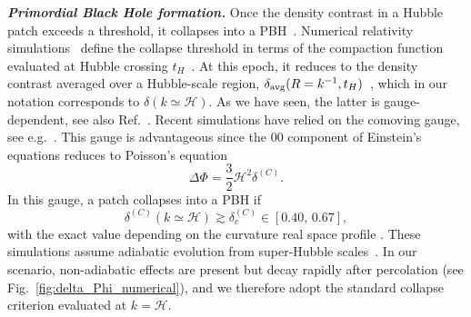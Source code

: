 \documentclass[twocolumn,superscriptaddress,aps,preprintnumbers,amsmath,amssymb,prl,footinbib]{revtex4-2}
\begin{document}
\textit{\textbf{ Primordial Black Hole formation.}}
Once the density contrast in a Hubble patch exceeds a threshold, it collapses into a PBH~\cite{Zeldovich:1967lct,Hawking:1971ei,Carr:1974nx,Carr:1975qj,Chapline:1975ojl}. Numerical relativity simulations~\cite{Escriva:2021aeh} define the collapse threshold in terms of the compaction function evaluated at Hubble crossing $t_H$~\cite{Shibata:1999zs,Harada:2023ffo}. At this epoch, it reduces to the density contrast averaged over a Hubble-scale region, $\delta_{\rm avg}(R=k^{-1},t_H)$~\cite{Musco:2018rwt,Escriva:2019phb}, which in our notation corresponds to $\delta(k\simeq\mathcal{H})$.
As we have seen, the latter is gauge-dependent, see also Ref.~\cite{Harada:2015yda}. Recent simulations have relied on the comoving gauge, see e.g.~\cite{Musco:2018rwt}. This gauge is advantageous since the $00$ component of Einstein's equations reduces to Poisson’s equation
\begin{equation}
\label{eq:Poisson_eq}
    \Delta \Phi = \frac{3}{2}\mathcal{H}^2\delta^{(C)}.
\end{equation}
 In this gauge, a patch collapses into a PBH if~\cite{Musco:2018rwt,Escriva:2019phb,Escriva:2021aeh}
\begin{equation}
\label{eq:PBH_threshold}
\delta^{(C)}(k\simeq\mathcal{H}) \gtrsim \delta_c^{(C)} \in [0.40,\,0.67],
\end{equation}
with the exact value depending on the curvature {real space} profile \cite{Musco:2020jjb}. These simulations assume adiabatic evolution from super-Hubble scales~\cite{Musco:2018rwt,Escriva:2019phb,Escriva:2021aeh}. In our scenario, {non-adiabatic effects are present} but decay rapidly after percolation (see Fig.~\ref{fig:delta_Phi_numerical}), and we therefore adopt the standard collapse criterion evaluated at $k=\mathcal{H}$.
\end{document}
